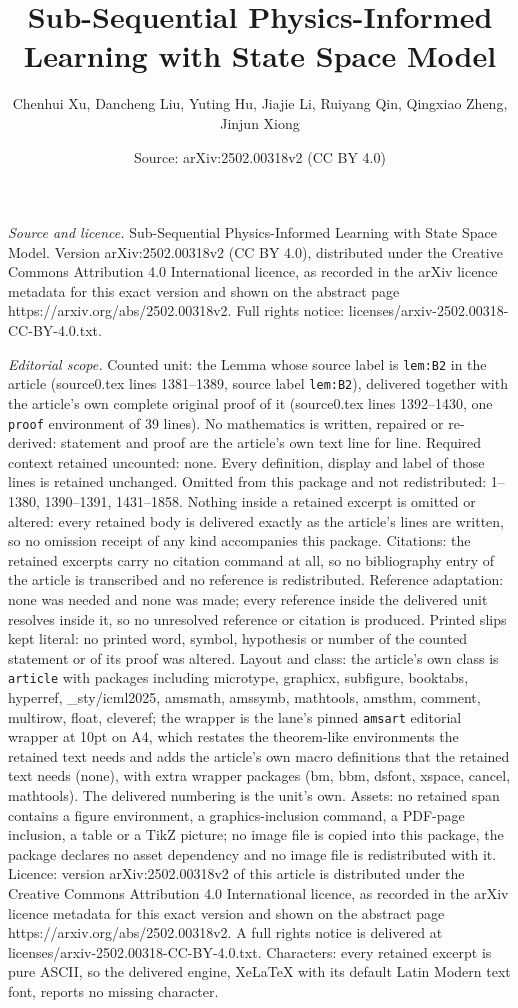\documentclass[10pt,a4paper]{amsart}
\title[Sub-Sequential Physics-Informed Learning with State Space Mo]{Sub-Sequential Physics-Informed Learning with State Space Model}
\author{Chenhui Xu, Dancheng Liu, Yuting Hu, Jiajie Li, Ruiyang Qin, Qingxiao Zheng, Jinjun Xiong}
\date{Source: arXiv:2502.00318v2 (CC BY 4.0)}
\begin{document}
\maketitle

\noindent\emph{Source and licence.} Sub-Sequential Physics-Informed Learning with State Space Model. Version arXiv:2502.00318v2 (CC BY 4.0), distributed under the Creative Commons Attribution 4.0 International licence, as recorded in the arXiv licence metadata for this exact version and shown on the abstract page https://arxiv.org/abs/2502.00318v2. Full rights notice: licenses/arxiv-2502.00318-CC-BY-4.0.txt.\par\smallskip

\noindent\textit{Editorial scope.} Counted unit: the Lemma whose source label is \texttt{lem:B2} in the article (source0.tex lines 1381--1389, source label \texttt{lem:B2}), delivered together with the article's own complete original proof of it (source0.tex lines 1392--1430, one \texttt{proof} environment of 39 lines). No mathematics is written, repaired or re-derived: statement and proof are the article's own text line for line. Required context retained uncounted: none. Every definition, display and label of those lines is retained unchanged. Omitted from this package and not redistributed: 1--1380, 1390--1391, 1431--1858. Nothing inside a retained excerpt is omitted or altered: every retained body is delivered exactly as the article's lines are written, so no omission receipt of any kind accompanies this package. Citations: the retained excerpts carry no citation command at all, so no bibliography entry of the article is transcribed and no reference is redistributed. Reference adaptation: none was needed and none was made; every reference inside the delivered unit resolves inside it, so no unresolved reference or citation is produced. Printed slips kept literal: no printed word, symbol, hypothesis or number of the counted statement or of its proof was altered. Layout and class: the article's own class is \texttt{article} with packages including microtype, graphicx, subfigure, booktabs, hyperref, \_sty/icml2025, amsmath, amssymb, mathtools, amsthm, comment, multirow, float, cleveref; the wrapper is the lane's pinned \texttt{amsart} editorial wrapper at 10pt on A4, which restates the theorem-like environments the retained text needs and adds the article's own macro definitions that the retained text needs (none), with extra wrapper packages (bm, bbm, dsfont, xspace, cancel, mathtools). The delivered numbering is the unit's own. Assets: no retained span contains a figure environment, a graphics-inclusion command, a PDF-page inclusion, a table or a TikZ picture; no image file is copied into this package, the package declares no asset dependency and no image file is redistributed with it. Licence: version arXiv:2502.00318v2 of this article is distributed under the Creative Commons Attribution 4.0 International licence, as recorded in the arXiv licence metadata for this exact version and shown on the abstract page https://arxiv.org/abs/2502.00318v2. A full rights notice is delivered at licenses/arxiv-2502.00318-CC-BY-4.0.txt. Characters: every retained excerpt is pure ASCII, so the delivered engine, XeLaTeX with its default Latin Modern text font, reports no missing character.
\end{document}
